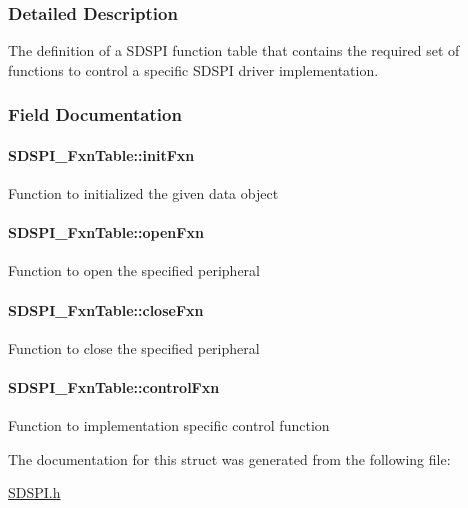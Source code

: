 \subsubsection{Detailed Description}
The definition of a S\-D\-S\-P\-I function table that contains the required set of functions to control a specific S\-D\-S\-P\-I driver implementation. 

\subsubsection{Field Documentation}
\paragraph[{init\-Fxn}]{ S\-D\-S\-P\-I\-\_\-\-Fxn\-Table\-::init\-Fxn}\label{struct_s_d_s_p_i___fxn_table_ac593f7347a7b145179fec8e4160816d2}
Function to initialized the given data object 
\paragraph[{open\-Fxn}]{ S\-D\-S\-P\-I\-\_\-\-Fxn\-Table\-::open\-Fxn}\label{struct_s_d_s_p_i___fxn_table_a822c1861740700d5cc489d063552e9e3}
Function to open the specified peripheral 
\paragraph[{close\-Fxn}]{ S\-D\-S\-P\-I\-\_\-\-Fxn\-Table\-::close\-Fxn}\label{struct_s_d_s_p_i___fxn_table_a13d86b2434f6e60f14a3926f97101c2c}
Function to close the specified peripheral 
\paragraph[{control\-Fxn}]{ S\-D\-S\-P\-I\-\_\-\-Fxn\-Table\-::control\-Fxn}\label{struct_s_d_s_p_i___fxn_table_a613920b0aee49813c55c892c73d0aec0}
Function to implementation specific control function 

The documentation for this struct was generated from the following file\-:\begin{DoxyCompactItemize}
\item 
\hyperlink{_s_d_s_p_i_8h}{S\-D\-S\-P\-I.\-h}\end{DoxyCompactItemize}
